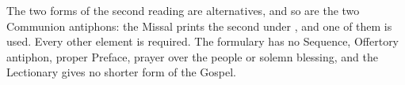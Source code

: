 \noindent The two forms of the second reading are alternatives, and so are the
two Communion antiphons: the Missal prints the second under , and
one of them is used. Every other element is required. The formulary has no
Sequence, Offertory antiphon, proper Preface, prayer over the people or solemn
blessing, and the Lectionary gives no shorter form of the Gospel.
